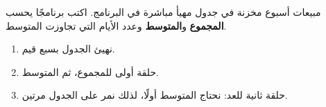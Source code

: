 \begin{statement}
مبيعات أسبوع مخزنة في جدول مهيأ مباشرة في البرنامج. اكتب برنامجًا يحسب \textbf{المجموع} و\textbf{المتوسط} وعدد الأيام التي تجاوزت المتوسط.
\end{statement}
\begin{stepsbox}\begin{enumerate}
\item نهيئ الجدول  بسبع قيم.
\item حلقة أولى للمجموع، ثم المتوسط.
\item حلقة ثانية للعد: نحتاج المتوسط أولًا، لذلك نمر على الجدول مرتين.
\end{enumerate}\end{stepsbox}
